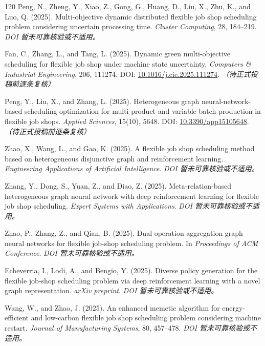 \documentclass[UTF8,a4paper,11pt]{ctexart}
\begin{document}
\begin{thebibliography}{120}
Peng, N., Zheng, Y., Xiao, Z., Gong, G., Huang, D., Liu, X., Zhu, K., and Luo, Q. (2025). Multi-objective dynamic distributed flexible job shop scheduling problem considering uncertain processing time. \emph{Cluster Computing}, 28, 184--219.
\newblock \textit{DOI 暂未可靠核验或不适用。}

Fan, C., Zhang, L., and Tang, L. (2025). Dynamic green multi-objective scheduling for flexible job shop under machine state uncertainty. \emph{Computers \& Industrial Engineering}, 206, 111274.
\newblock DOI: \href{https://doi.org/10.1016/j.cie.2025.111274}{10.1016/j.cie.2025.111274}. \textit{（待正式投稿前逐条复核）}

Peng, Y., Liu, X., and Zhang, L. (2025). Heterogeneous graph neural-network-based scheduling optimization for multi-product and variable-batch production in flexible job shops. \emph{Applied Sciences}, 15(10), 5648.
\newblock DOI: \href{https://doi.org/10.3390/app15105648}{10.3390/app15105648}. \textit{（待正式投稿前逐条复核）}

Zhao, X., Wang, L., and Gao, K. (2025). A flexible job shop scheduling method based on heterogeneous disjunctive graph and reinforcement learning. \emph{Engineering Applications of Artificial Intelligence}.
\newblock \textit{DOI 暂未可靠核验或不适用。}

Zhang, Y., Dong, S., Yuan, Z., and Diao, Z. (2025). Meta-relation-based heterogeneous graph neural network with deep reinforcement learning for flexible job shop scheduling. \emph{Expert Systems with Applications}.
\newblock \textit{DOI 暂未可靠核验或不适用。}

Zhao, P., Zhang, Z., and Qian, B. (2025). Dual operation aggregation graph neural networks for flexible job-shop scheduling problem. In \emph{Proceedings of ACM Conference}.
\newblock \textit{DOI 暂未可靠核验或不适用。}

Echeverria, I., Lodi, A., and Bengio, Y. (2025). Diverse policy generation for the flexible job-shop scheduling problem via deep reinforcement learning with a novel graph representation. \emph{arXiv preprint}.
\newblock \textit{DOI 暂未可靠核验或不适用。}

Wang, W., and Zhao, J. (2025). An enhanced memetic algorithm for energy-efficient and low-carbon flexible job shop scheduling problem considering machine restart. \emph{Journal of Manufacturing Systems}, 80, 457--478.
\newblock \textit{DOI 暂未可靠核验或不适用。}


\end{thebibliography}
\end{document}
